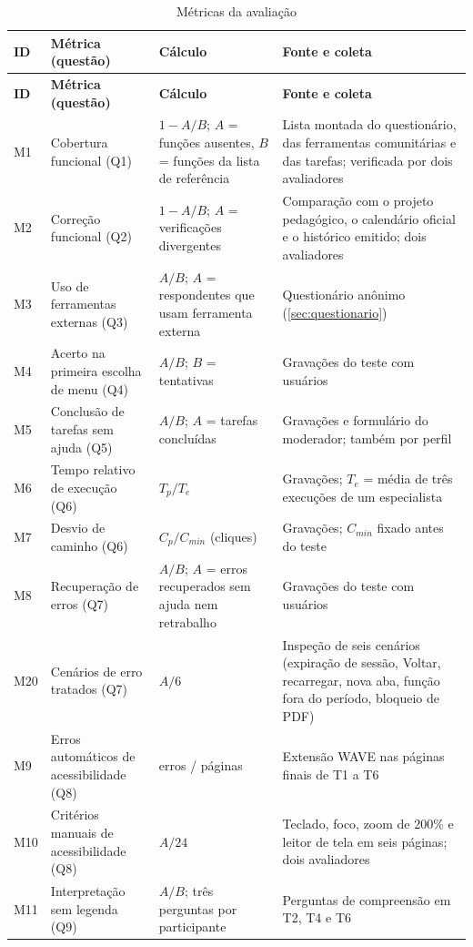 {\scriptsize
\begin{longtable}{L{0.6cm} L{3.6cm} L{4.5cm} L{5.6cm}}
	\caption{Métricas da avaliação}
	\label{tab:metricas} \\
	\toprule
	\textbf{ID} & \textbf{Métrica (questão)} & \textbf{Cálculo} & \textbf{Fonte e coleta} \\
	\midrule
	\endfirsthead
	\toprule
	\textbf{ID} & \textbf{Métrica (questão)} & \textbf{Cálculo} & \textbf{Fonte e coleta} \\
	\midrule
	\endhead
	\bottomrule
	\endfoot
	M1 & Cobertura funcional (Q1) & $1 - A/B$; $A$ = funções ausentes, $B$ = funções da lista de referência & Lista montada do questionário, das ferramentas comunitárias e das tarefas; verificada por dois avaliadores \\
	M2 & Correção funcional (Q2) & $1 - A/B$; $A$ = verificações divergentes & Comparação com o projeto pedagógico, o calendário oficial e o histórico emitido; dois avaliadores \\
	M3 & Uso de ferramentas externas (Q3) & $A/B$; $A$ = respondentes que usam ferramenta externa & Questionário anônimo (\autoref{sec:questionario}) \\
	M4 & Acerto na primeira escolha de menu (Q4) & $A/B$; $B$ = tentativas & Gravações do teste com usuários \\
	M5 & Conclusão de tarefas sem ajuda (Q5) & $A/B$; $A$ = tarefas concluídas & Gravações e formulário do moderador; também por perfil \\
	M6 & Tempo relativo de execução (Q6) & $T_p / T_e$ & Gravações; $T_e$ = média de três execuções de um especialista \\
	M7 & Desvio de caminho (Q6) & $C_p / C_{min}$ (cliques) & Gravações; $C_{min}$ fixado antes do teste \\
	M8 & Recuperação de erros (Q7) & $A/B$; $A$ = erros recuperados sem ajuda nem retrabalho & Gravações do teste com usuários \\
	M20 & Cenários de erro tratados (Q7) & $A/6$ & Inspeção de seis cenários (expiração de sessão, Voltar, recarregar, nova aba, função fora do período, bloqueio de PDF) \\
	M9 & Erros automáticos de acessibilidade (Q8) & erros / páginas & Extensão WAVE nas páginas finais de T1 a T6 \\
	M10 & Critérios manuais de acessibilidade (Q8) & $A/24$ & Teclado, foco, zoom de 200\% e leitor de tela em seis páginas; dois avaliadores \\
	M11 & Interpretação sem legenda (Q9) & $A/B$; três perguntas por participante & Perguntas de compreensão em T2, T4 e T6 \\

\end{longtable}}

